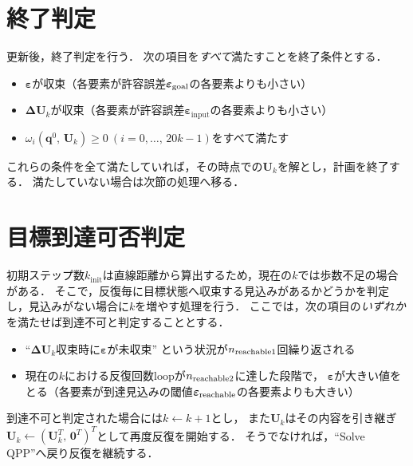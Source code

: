 \documentclass[autodetect-engine,dvipdfmx-if-dvi,ja=standard,a4j,jbase=11pt,magstyle=nomag*]{bxjsreport}
\begin{document}
\section{終了判定}
更新後，終了判定を行う．
次の項目を\emph{すべて}満たすことを終了条件とする．
\begin{itemize}
    \item   $\bm{\varepsilon}$が収束（各要素が許容誤差$\bm{\varepsilon}_{\mathrm{goal}}$の各要素よりも小さい）
    \item   $\bm{\Delta U}_k$が収束（各要素が許容誤差$\bm{\varepsilon}_{\mathrm{input}}$の各要素よりも小さい）
    \item   $\omega_i(\bm{q}^0 ,\, \bm{U}_k) \geq 0 \ (i = 0 , \dots ,\, 20k - 1)$をすべて満たす
\end{itemize}
これらの条件を全て満たしていれば，その時点での$\bm{U}_k$を解とし，計画を終了する．
満たしていない場合は次節の処理へ移る．

\section{目標到達可否判定}
初期ステップ数$k_\mathrm{init}$は直線距離から算出するため，現在の$k$では歩数不足の場合がある．
そこで，反復毎に目標状態へ収束する見込みがあるかどうかを判定し，見込みがない場合に$k$を増やす処理を行う．
ここでは，次の項目の\emph{いずれか}を満たせば到達不可と判定することとする．
\begin{itemize}
    \item   ``$\bm{\Delta U}_k$収束時に$\bm{\varepsilon}$が未収束'' という状況が$n_{\mathrm{reachable}1}$回繰り返される
    \item   現在の$k$における反復回数$\mathrm{loop}$が$n_{\mathrm{reachable}2}$に達した段階で，
   $\bm{\varepsilon}$が大きい値をとる（各要素が到達見込みの閾値$\bm{\varepsilon}_{\mathrm{reachable}}$の各要素よりも大きい）
\end{itemize}
到達不可と判定された場合には$k \gets k + 1$とし，
また$\bm{U}_k$はその内容を引き継ぎ$\bm{U}_k \gets ( \bm{U}_k^T ,\, \bm{0}^T )^T$として再度反復を開始する．
そうでなければ，``Solve QPP''へ戻り反復を継続する．
\end{document}
